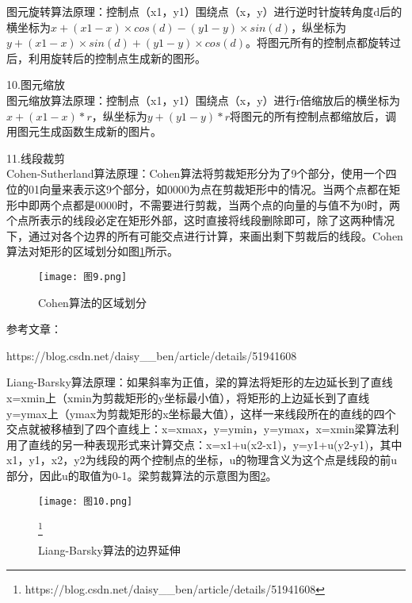 \documentclass[a4paper,UTF8]{article}
\theoremstyle{definition}
\begin{document}
\indent{}图元旋转算法原理：控制点（x1，y1）围绕点（x，y）进行逆时针旋转角度d后的横坐标为$x+(x1-x)\times{}cos(d)-(y1-y)\times{}sin(d)$，纵坐标为$y+(x1-x)\times{}sin(d)+(y1-y)\times{}cos(d)$。将图元所有的控制点都旋转过后，利用旋转后的控制点生成新的图形。

\noindent{}10.图元缩放\\

\indent{}图元缩放算法原理：控制点（x1，y1）围绕点（x，y）进行r倍缩放后的横坐标为$x+(x1-x)*r$，纵坐标为$y+(y1-y)*r$将图元的所有控制点都缩放后，调用图元生成函数生成新的图片。

\noindent{}11.线段裁剪\\


\indent{}Cohen-Sutherland算法原理：Cohen算法将剪裁矩形分为了9个部分，使用一个四位的01向量来表示这9个部分，如0000为点在剪裁矩形中的情况。当两个点都在矩形中即两个点都是0000时，不需要进行剪裁，当两个点的向量的与值不为0时，两个点所表示的线段必定在矩形外部，这时直接将线段删除即可，除了这两种情况下，通过对各个边界的所有可能交点进行计算，来画出剩下剪裁后的线段。Cohen算法对矩形的区域划分如图\ref{fig:图9}所示。

\begin{figure}[htbp]
   \centering
   \texttt{[image: 图9.png]} %
   \caption{Cohen算法的区域划分}
   \label{fig:图9}
\end{figure}

\indent{}参考文章：

https://blog.csdn.net/daisy\_\_ben/article/details/51941608

\indent{}Liang-Barsky算法原理：如果斜率为正值，梁的算法将矩形的左边延长到了直线x=xmin上（xmin为剪裁矩形的y坐标最小值），将矩形的上边延长到了直线y=ymax上（ymax为剪裁矩形的x坐标最大值），这样一来线段所在的直线的四个交点就被移植到了四个直线上：x=xmax，y=ymin，y=ymax，x=xmin梁算法利用了直线的另一种表现形式来计算交点：x=x1+u(x2-x1)，y=y1+u(y2-y1)，其中x1，y1，x2，y2为线段的两个控制点的坐标，u的物理含义为这个点是线段的前u部分，因此u的取值为0-1。梁剪裁算法的示意图为图\ref{fig:图10}。

\begin{figure}[htbp]
   \centering
   \texttt{[image: 图10.png]} %
   \caption{Liang-Barsky算法的边界延伸}\footnote{https://blog.csdn.net/daisy\_\_ben/article/details/51941608}
   \label{fig:图10}
\end{figure}
\end{document}
